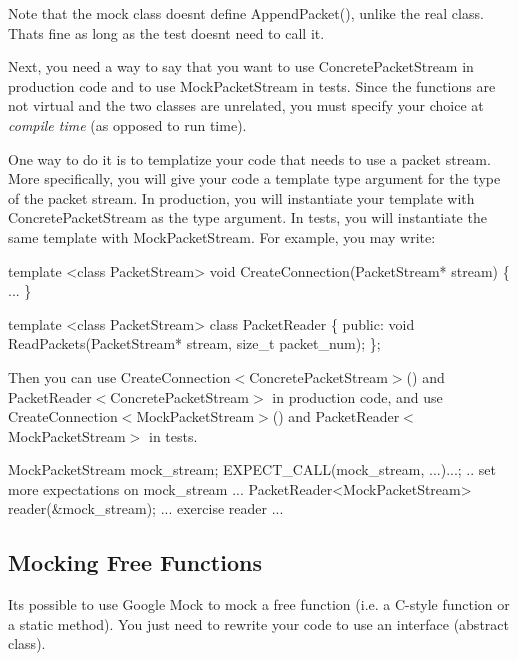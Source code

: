 Note that the mock class doesn\textquotesingle{}t define {\ttfamily Append\+Packet()}, unlike the real class. That\textquotesingle{}s fine as long as the test doesn\textquotesingle{}t need to call it.

Next, you need a way to say that you want to use {\ttfamily Concrete\+Packet\+Stream} in production code and to use {\ttfamily Mock\+Packet\+Stream} in tests. Since the functions are not virtual and the two classes are unrelated, you must specify your choice at {\itshape compile time} (as opposed to run time).

One way to do it is to templatize your code that needs to use a packet stream. More specifically, you will give your code a template type argument for the type of the packet stream. In production, you will instantiate your template with {\ttfamily Concrete\+Packet\+Stream} as the type argument. In tests, you will instantiate the same template with {\ttfamily Mock\+Packet\+Stream}. For example, you may write\+:


\begin{DoxyCode}
\textcolor{keyword}{template} <\textcolor{keyword}{class} PacketStream>
\textcolor{keywordtype}{void} CreateConnection(PacketStream* stream) \{ ... \}

\textcolor{keyword}{template} <\textcolor{keyword}{class} PacketStream>
\textcolor{keyword}{class }PacketReader \{
 \textcolor{keyword}{public}:
  \textcolor{keywordtype}{void} ReadPackets(PacketStream* stream, \textcolor{keywordtype}{size\_t} packet\_num);
\};
\end{DoxyCode}


Then you can use {\ttfamily Create\+Connection$<$Concrete\+Packet\+Stream$>$()} and {\ttfamily Packet\+Reader$<$Concrete\+Packet\+Stream$>$} in production code, and use {\ttfamily Create\+Connection$<$Mock\+Packet\+Stream$>$()} and {\ttfamily Packet\+Reader$<$Mock\+Packet\+Stream$>$} in tests.


\begin{DoxyCode}
MockPacketStream mock\_stream;
EXPECT\_CALL(mock\_stream, ...)...;
.. \textcolor{keyword}{set} more expectations on mock\_stream ...
PacketReader<MockPacketStream> reader(&mock\_stream);
... exercise reader ...
\end{DoxyCode}


\subsection*{Mocking Free Functions}

It\textquotesingle{}s possible to use Google Mock to mock a free function (i.\+e. a C-\/style function or a static method). You just need to rewrite your code to use an interface (abstract class).

